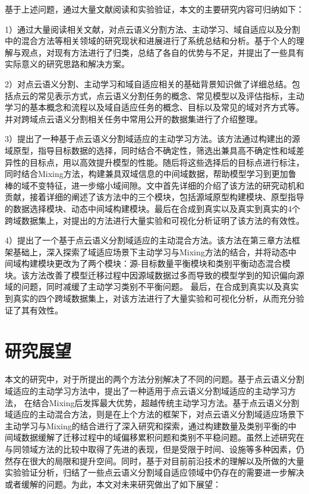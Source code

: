 基于上述问题，通过大量文献阅读和实验验证，本文的主要研究内容可归纳如下：

1）通过大量阅读相关文献，对点云语义分割方法、主动学习、域自适应以及分割中的混合方法等相关领域的研究现状和进展进行了系统总结和分析。基于个人的理解与观点，对现有方法进行了归类，总结了各自的优势与不足，并提出了一些具有实际意义的研究思路和解决方案。

2）对点云语义分割、主动学习和域自适应相关的基础背景知识做了详细总结。包括点云的常见表示方式，点云语义分割任务的概念、常见模型以及评估指标，主动学习的基本概念和流程以及域自适应任务的概念、目标以及常见的域对齐方式等。并对跨域点云语义分割相关任务中常用公开的数据集进行了介绍整理。

3）提出了一种基于点云语义分割域适应的主动学习方法。该方法通过构建出的源域原型，指导目标数据的选择，同时结合不确定性，筛选出兼具高不确定性和域差异性的目标点，用以高效提升模型的性能。随后将这些选择后的目标点进行标注，同时结合Mixing方法，构建兼具双域信息的中间域数据，帮助模型学习到更加鲁棒的域不变特征，进一步缩小域间隙。文中首先详细的介绍了该方法的研究动机和贡献，接着详细的阐述了该方法中的三个模块，包括源域原型构建模块、原型指导的数据选择模块、动态中间域构建模块。最后在合成到真实以及真实到真实的4个跨域数据集上，对提出的方法进行大量实验和可视化分析证明了该方法的有效性。

4）提出了一个基于点云语义分割域适应的主动混合方法。该方法在第三章方法框架基础上，深入探索了域适应场景下主动学习与Mixing方法的结合，并将动态中间域构建模块更改为了两个模块：源-目标数量平衡模块和类别平衡动态混合模块。该方法改善了模型迁移过程中因源域数据过多而导致的模型学到的知识偏向源域的问题，同时减缓了主动学习类别不平衡问题。
最后，在合成到真实以及真实到真实的四个跨域数据集上，对该方法进行了大量实验和可视化分析，从而充分验证了其有效性。

\section{研究展望}
本文的研究中，对于所提出的两个方法分别解决了不同的问题。基于点云语义分割域适应的主动学习方法中，提出了一种适用于点云语义分割域适应的主动学习方法，
在结合Mixing后发挥最大优势，超越传统主动学习方法。基于点云语义分割域适应的主动混合方法，则是在上个方法的框架下，对点云语义分割域适应场景下主动学习与Mixing的结合进行了深入研究和探索，通过构建数量及类别平衡的中间域数据缓解了迁移过程中的域偏移累积问题和类别不平稳问题。虽然上述研究在与同领域方法的比较中取得了先进的表现，但是受限于时间、设施等多种因素，仍然存在很大的局限和提升空间。同时，基于对目前前沿技术的理解以及所做的大量实验验证分析，归结了一些点云语义分割域自适应领域中仍存在的需要进一步解决或者缓解的问题。为此，本文对未来研究做出了如下展望：

